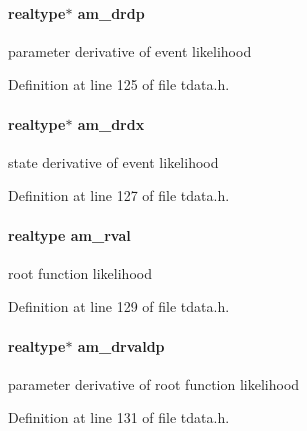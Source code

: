 \hypertarget{struct_temp_data_ab9c815d99f44f36f068133746323b5cc}{}
\paragraph[{am\+\_\+drdp}]{\setlength{\rightskip}{0pt plus 5cm}realtype$\ast$ am\+\_\+drdp}\label{struct_temp_data_ab9c815d99f44f36f068133746323b5cc}
parameter derivative of event likelihood 

Definition at line 125 of file tdata.\+h.

\hypertarget{struct_temp_data_a92cb58d44aef5760bf9ad22690e48113}{}
\paragraph[{am\+\_\+drdx}]{\setlength{\rightskip}{0pt plus 5cm}realtype$\ast$ am\+\_\+drdx}\label{struct_temp_data_a92cb58d44aef5760bf9ad22690e48113}
state derivative of event likelihood 

Definition at line 127 of file tdata.\+h.

\hypertarget{struct_temp_data_abf2c3d254f311ab4385f18cff8acb89a}{}
\paragraph[{am\+\_\+rval}]{\setlength{\rightskip}{0pt plus 5cm}realtype am\+\_\+rval}\label{struct_temp_data_abf2c3d254f311ab4385f18cff8acb89a}
root function likelihood 

Definition at line 129 of file tdata.\+h.

\hypertarget{struct_temp_data_af51ded83b415e8a9d8e4f67736d11d34}{}
\paragraph[{am\+\_\+drvaldp}]{\setlength{\rightskip}{0pt plus 5cm}realtype$\ast$ am\+\_\+drvaldp}\label{struct_temp_data_af51ded83b415e8a9d8e4f67736d11d34}
parameter derivative of root function likelihood 

Definition at line 131 of file tdata.\+h.

